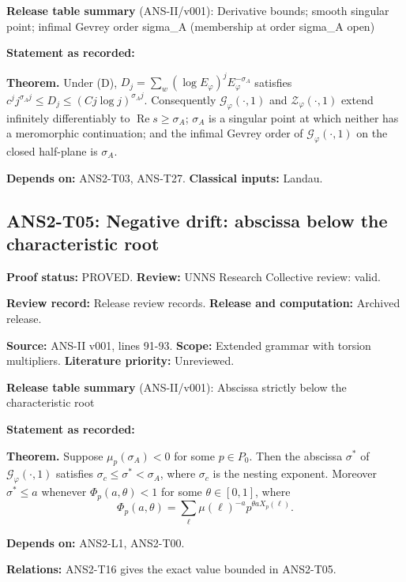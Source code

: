 \documentclass[
  11pt,
]{article}
\begin{document}
\textbf{Release table summary} (ANS-II/v001): Derivative bounds; smooth
singular point; infimal Gevrey order sigma\_A (membership at order
sigma\_A open)

\textbf{Statement as recorded:}

\textbf{Theorem.} Under (D),
\(D_j=\sum_w(\log E_\varphi)^jE_\varphi^{-\sigma_A}\) satisfies
\(c^jj^{\sigma_Aj}\le D_j\le(Cj\log j)^{\sigma_Aj}\). Consequently
\(\mathcal G_\varphi(\cdot,1)\) and \(\mathcal Z_\varphi(\cdot,1)\)
extend infinitely differentiably to \(\operatorname{Re}s\ge\sigma_A\);
\(\sigma_A\) is a singular point at which neither has a meromorphic
continuation; and the infimal Gevrey order of
\(\mathcal G_\varphi(\cdot,1)\) on the closed half-plane is
\(\sigma_A\).

\textbf{Depends on:} ANS2-T03, ANS-T27. \textbf{Classical inputs:}
Landau.

\hypertarget{ans2-t05-negative-drift-abscissa-below-the-characteristic-root}{%
\subsection{ANS2-T05: Negative drift: abscissa below the characteristic
root}\label{ans2-t05-negative-drift-abscissa-below-the-characteristic-root}}

\textbf{Proof status:} PROVED. \textbf{Review:} UNNS Research Collective
review: valid.

\textbf{Review record:} Release review records. \textbf{Release and
computation:} Archived release.

\textbf{Source:} ANS-II v001, lines 91-93. \textbf{Scope:} Extended
grammar with torsion multipliers. \textbf{Literature priority:}
Unreviewed.

\textbf{Release table summary} (ANS-II/v001): Abscissa strictly below
the characteristic root

\textbf{Statement as recorded:}

\textbf{Theorem.} Suppose \(\mu_p(\sigma_A)<0\) for some \(p\in P_0\).
Then the abscissa \(\sigma^\ast\) of \(\mathcal G_\varphi(\cdot,1)\)
satisfies \(\sigma_c\le\sigma^\ast<\sigma_A\), where \(\sigma_c\) is the
nesting exponent. Moreover \(\sigma^\ast\le a\) whenever
\(\Phi_p(a,\theta)<1\) for some \(\theta\in[0,1]\), where
\[\Phi_p(a,\theta)=\sum_\ell\mu(\ell)^{-a}p^{\theta aX_p(\ell)}.\]

\textbf{Depends on:} ANS2-L1, ANS2-T00.

\textbf{Relations:} ANS2-T16 gives the exact value bounded in ANS2-T05.
\end{document}
